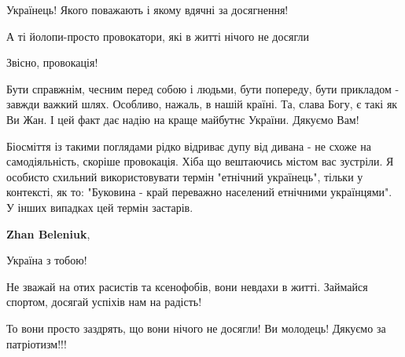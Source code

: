 \begin{itemize}
Українець! Якого поважають і якому вдячні за досягнення!

А ті йолопи-просто провокатори, які в житті нічого не досягли


 
Звісно, провокація!

Бути справжнім, чесним перед собою і людьми, бути попереду, бути прикладом -
завжди важкий шлях. Особливо, нажаль, в нашій країні. Та, слава Богу, є такі як
Ви Жан. І цей факт дає надію на краще майбутнє України. Дякуємо Вам!

 

Біосміття із такими поглядами рідко відриває дупу від дивана - не схоже на
самодіяльність, скоріше провокація. Хіба що вештаючись містом вас зустріли. Я
особисто схильний використовувати термін "етнічний українець", тільки у
контексті, як то: "Буковина - край переважно населений етнічними українцями". У
інших випадках цей термін застарів.


 
\textbf{Zhan Beleniuk}, 

Україна з тобою!

Не зважай на отих расистів та ксенофобів, вони невдахи в житті. Займайся
спортом, досягай успіхів нам на радість!


 

То вони просто заздрять, що вони нічого не досягли! Ви молодець! Дякуємо за патріотизм!!!

 


\end{itemize}
